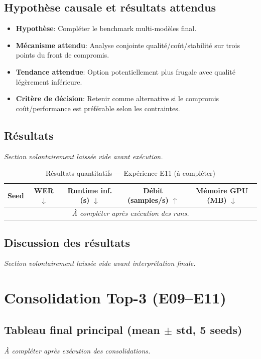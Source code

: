 \documentclass[11pt,a4paper]{article}
\begin{document}
\subsection{Hypothèse causale et résultats attendus}
\begin{itemize}[leftmargin=1.2cm]
\item \textbf{Hypothèse}: Compléter le benchmark multi-modèles final.
\item \textbf{Mécanisme attendu}: Analyse conjointe qualité/coût/stabilité sur trois points du front de compromis.
\item \textbf{Tendance attendue}: Option potentiellement plus frugale avec qualité légèrement inférieure.
\item \textbf{Critère de décision}: Retenir comme alternative si le compromis coût/performance est préférable selon les contraintes.
\end{itemize}

\subsection{Résultats}
\textit{Section volontairement laissée vide avant exécution.}

\begin{table}[H]
\centering
\caption{Résultats quantitatifs --- Expérience E11 (à compléter)}
\begin{tabular}{lcccc}
\toprule
Seed & WER $\downarrow$ & Runtime inf. (s) $\downarrow$ & Débit (samples/s) $\uparrow$ & Mémoire GPU (MB) $\downarrow$ \\
\midrule
\multicolumn{5}{c}{\textit{À compléter après exécution des runs.}} \\
\bottomrule
\end{tabular}
\end{table}

\subsection{Discussion des résultats}
\textit{Section volontairement laissée vide avant interprétation finale.}


\section{Consolidation Top-3 (E09--E11)}
\subsection{Tableau final principal (mean $\pm$ std, 5 seeds)}
\textit{À compléter après exécution des consolidations.}
\end{document}
